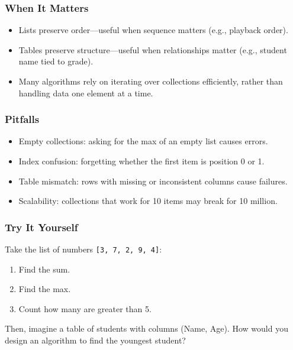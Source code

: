 \documentclass[
  letterpaper,
  DIV=11,
  numbers=noendperiod]{scrreprt}
\providecommand{\tightlist}{%
  \setlength{\itemsep}{0pt}\setlength{\parskip}{0pt}}
\begin{document}
\subsubsection{When It Matters}\label{when-it-matters-11}

\begin{itemize}
\tightlist
\item
  Lists preserve order---useful when sequence matters (e.g., playback
  order).
\item
  Tables preserve structure---useful when relationships matter (e.g.,
  student name tied to grade).
\item
  Many algorithms rely on iterating over collections efficiently, rather
  than handling data one element at a time.
\end{itemize}

\subsubsection{Pitfalls}\label{pitfalls-10}

\begin{itemize}
\tightlist
\item
  Empty collections: asking for the max of an empty list causes errors.
\item
  Index confusion: forgetting whether the first item is position 0 or 1.
\item
  Table mismatch: rows with missing or inconsistent columns cause
  failures.
\item
  Scalability: collections that work for 10 items may break for 10
  million.
\end{itemize}

\subsubsection{Try It Yourself}\label{try-it-yourself-13}

Take the list of numbers \texttt{{[}3,\ 7,\ 2,\ 9,\ 4{]}}:

\begin{enumerate}
\def\labelenumi{\arabic{enumi}.}
\tightlist
\item
  Find the sum.
\item
  Find the max.
\item
  Count how many are greater than 5.
\end{enumerate}

Then, imagine a table of students with columns (Name, Age). How would
you design an algorithm to find the youngest student?
\end{document}
